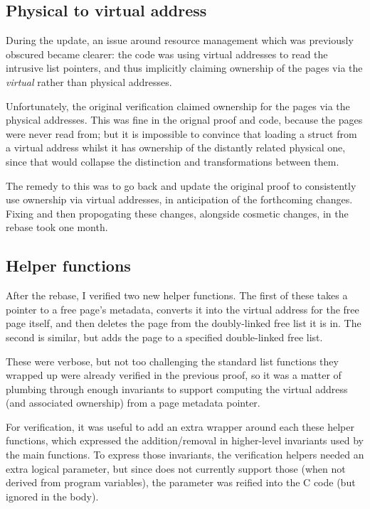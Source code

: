 \subsection{Physical to virtual address}

During the update, an issue around resource management which was previously
obscured became clearer: the code was using virtual addresses to read the
intrusive list pointers, and thus implicitly claiming ownership of the pages
via the \emph{virtual} rather than physical addresses.

Unfortunately, the original verification claimed ownership for the pages via
the physical addresses. This was fine in the orignal proof and code, because
the pages were never read from; but it is impossible to convince  that
loading a struct from a virtual address whilst it has ownership of the
distantly related physical one, since that would collapse the distinction and
transformations between them.

The remedy to this was to go back and update the original proof to consistently
use ownership via virtual addresses, in anticipation of the forthcoming
changes. Fixing and then propogating these changes, alongside cosmetic changes,
in the rebase took one month.

\subsection{Helper functions}

After the rebase, I verified two new helper functions. The first of these takes
a pointer to a free page's metadata, converts it into the virtual address for
the free page itself, and then deletes the page from the doubly-linked free
list it is in. The second is similar, but adds the page to a specified
double-linked free list.

These were verbose, but not too challenging \textemdash{} the standard list
functions they wrapped up were already verified in the previous proof, so it
was a matter of plumbing through enough invariants to support computing the
virtual address (and associated ownership) from a page metadata pointer.

For verification, it was useful to add an extra wrapper around each these
helper functions, which expressed the addition/removal in higher-level
invariants used by the main functions. To express those invariants, the
verification helpers needed an extra logical parameter, but since
 does not currently support those (when not derived from program
variables), the parameter was reified into the C code (but ignored in the
body).

